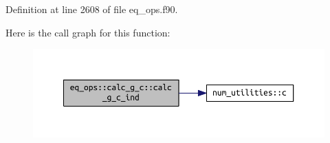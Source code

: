 Definition at line 2608 of file eq\+\_\+ops.\+f90.

Here is the call graph for this function\+:\nopagebreak
\begin{figure}[H]
\begin{center}
\leavevmode
\includegraphics[width=350pt]{interfaceeq__ops_1_1calc__g__c_a55dca52f3f82960703162dba425d358d_cgraph}
\end{center}
\end{figure}


